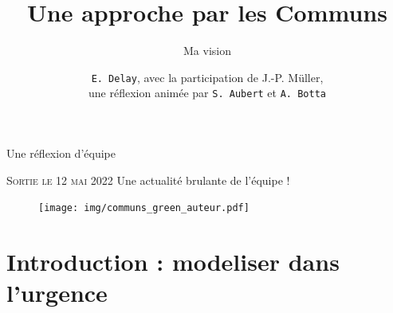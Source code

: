 \documentclass[newPxFont]{beamer}
\title{Une approche par les Communs}
\subtitle{Ma vision}
\author{\texttt{E. Delay}, avec la participation de J.-P. Müller,\\
 une réflexion animée par \texttt{S. Aubert} et \texttt{A. Botta}}
\institute{CIRAD -- UMR SENS}
\begin{document}
%
%


\maketitle


%
%


\begin{frame}[c]{Une réflexion d'équipe}
\vspace{-1cm}
\begin{alertblock}{\textsc{ Sortie le 12 mai 2022}}
    Une actualité brulante de l'équipe !
\end{alertblock}
\begin{figure}
  \texttt{[image: img/communs\_green\_auteur.pdf]}
\end{figure}
\end{frame}

\section{Introduction : modeliser dans l'urgence}
\end{document}

